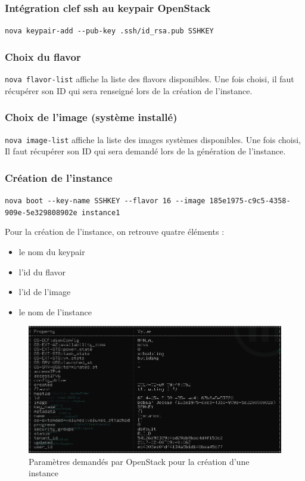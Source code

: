 \documentclass[]{article}
\begin{document}
\subsubsection{Intégration clef ssh au keypair
OpenStack}\label{intuxe9gration-clef-ssh-au-keypair-OpenStack}

\texttt{nova\ keypair-add\ -\/-pub-key\ .ssh/id\_rsa.pub\ SSHKEY}

\subsubsection{Choix du flavor}\label{choix-du-flavor}

\texttt{nova\ flavor-list} affiche la liste des flavors disponibles. Une
fois choisi, il faut récupérer son ID qui sera renseigné lors de la
création de l'instance.

\subsubsection{Choix de l'image (système
installé)}\label{choix-de-limage-systuxe8me-installuxe9}

\texttt{nova\ image-list} affiche la liste des images systèmes
disponibles. Une fois choisi, Il faut récupérer son ID qui sera demandé
lors de la génération de l'instance.

\subsubsection{Création de l'instance}\label{cruxe9ation-de-linstance-1}

\texttt{nova\ boot\ -\/-key-name\ SSHKEY\ -\/-flavor\ 16\ -\/-image\ 185e1975-c9c5-4358-909e-5e329808902e\ instance1}

Pour la création de l'instance, on retrouve quatre éléments : 
\begin{itemize}
\item le nom du keypair 
\item l'id du flavor 
\item l'id de l'image
\item le nom de l'instance
\end{itemize}
\vspace{5mm}
\begin{figure}
\centering
\includegraphics{Images/eeee.png}
\caption{Paramètres demandés par OpenStack pour la création d'une instance}
\end{figure}
\end{document}
